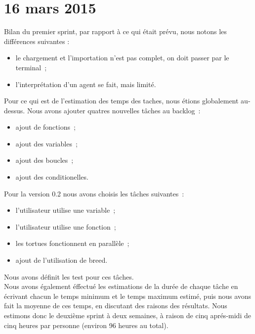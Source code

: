 \section{16 mars 2015}

Bilan du premier sprint, par rapport à ce qui était prévu, nous notons les différences suivantes :
\begin{itemize}
\item le chargement et l'importation n'est pas complet, on doit passer par le terminal~;
\item l'interprétation d'un agent se fait, mais limité.
\end{itemize}
Pour ce qui est de l'estimation des temps des taches, nous étions globalement au-dessus.
Nous avons ajouter quatres nouvelles tâches au backlog~:
\begin{itemize}
\item ajout de fonctions~;
\item ajout des variables~;
\item ajout des boucles~;
\item ajout des conditionelles.
\end{itemize}
Pour la version 0.2 nous avons choisis les tâches suivantes~:
\begin{itemize}
\item l'utilisateur utilise une variable~;
\item l'utilisateur utilise une fonction~;
\item les tortues fonctionnent en parallèle~;
\item ajout de l'utilisation de breed.
\end{itemize}
Nous avons définit les test pour ces tâches.\\
Nous avons également éffectué les estimations de la durée de chaque tâche en écrivant chacun le temps minimum et le temps maximum estimé, puis nous avons fait la moyenne de ces temps, en discutant des raisons des résultats.
Nous estimons donc le deuxième sprint à deux semaines, à raison de cinq aprés-midi de cinq heures par personne (environ 96 heures au total).\\

